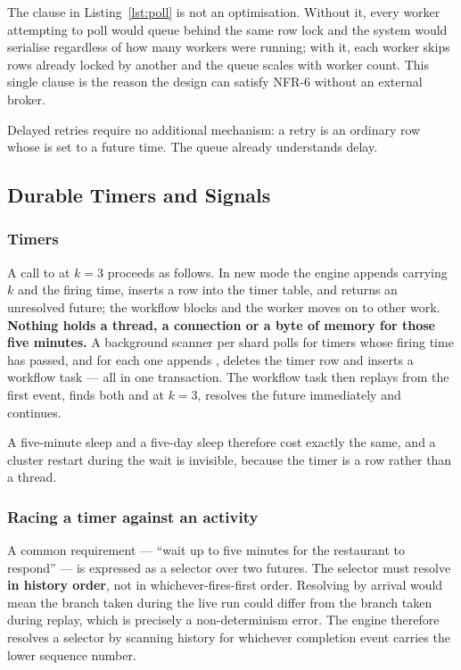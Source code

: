 The  clause in Listing~\ref{lst:poll} is not an optimisation.
Without it, every worker attempting to poll would queue behind the same row
lock and the system would serialise regardless of how many workers were
running; with it, each worker skips rows already locked by another and the
queue scales with worker count. This single clause is the reason the design
can satisfy NFR-6 without an external broker.

Delayed retries require no additional mechanism: a retry is an ordinary row
whose  is set to a future time. The queue already understands
delay.

\subsection{Durable Timers and Signals}

\subsubsection{Timers}

A call to  at $k=3$ proceeds as follows. In new
mode the engine appends  carrying $k$ and the firing time,
inserts a row into the timer table, and returns an unresolved future; the
workflow blocks and the worker moves on to other work. \textbf{Nothing holds a
thread, a connection or a byte of memory for those five minutes.} A background
scanner per shard polls for timers whose firing time has passed, and for each
one appends , deletes the timer row and inserts a workflow task
--- all in one transaction. The workflow task then replays from the first
event, finds both  and  at $k=3$, resolves the
future immediately and continues.

A five-minute sleep and a five-day sleep therefore cost exactly the same, and
a cluster restart during the wait is invisible, because the timer is a row
rather than a thread.

\subsubsection{Racing a timer against an activity}

A common requirement --- ``wait up to five minutes for the restaurant to
respond'' --- is expressed as a selector over two futures. The selector must
resolve \textbf{in history order}, not in whichever-fires-first order.
Resolving by arrival would mean the branch taken during the live run could
differ from the branch taken during replay, which is precisely a
non-determinism error. The engine therefore resolves a selector by scanning
history for whichever completion event carries the lower sequence number.

